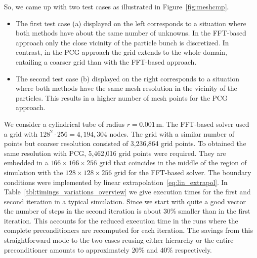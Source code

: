 So, we came up with two test cases as illustrated in
Figure~\ref{fig:meshcmp}.
\begin{itemize}
\item The first test case (a) displayed on the left corresponds to a
  situation where both methods have about the same number of unknowns.
  In the FFT-based approach only the close vicinity of the particle
  bunch is discretized.  In contrast, in the PCG approach the grid
  extends to the whole domain, entailing a coarser grid than with the
  FFT-based approach.

\item The second test case (b) displayed on the right corresponds to a
  situation where both methods have the same mesh resolution in the
  vicinity of the particles.  This results in a higher number of mesh
  points for the PCG approach.
\end{itemize}

We consider a cylindrical tube of radius $r=0.001$\,m.  The FFT-based
solver used a grid with $128^2\cdot256=4,194,304$ nodes.  The grid with
a similar number of points but coarser resolution consisted of 3,236,864
grid points.  To obtained the same resolution with PCG, 5,462,016 grid
points were required.  They are embedded in a $166\times166\times256$
grid that coincides in the middle of the region of simulation with the
$128\times128\times256$ grid for the FFT-based solver.  The boundary
conditions were implemented by linear
extrapolation~\eqref{eq:lin_extrapol}.  In
Table~\ref{tbl:timings_variations_overview} we give execution times for
the first and second iteration in a typical simulation.  Since we start
with quite a good vector the number of steps in the second iteration is
about 30\% smaller than in the first iteration.  This accounts for the
reduced execution time in the runs where the complete preconditioners
are recomputed for each iteration.  The savings from this
straightforward mode to the two cases reusing either hierarchy or the
entire preconditioner amounts to approximately $20\%$ and $40\%$
respectively.

